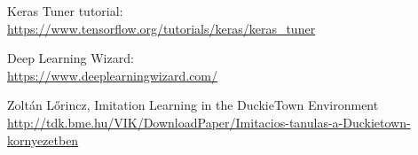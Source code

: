 \documentclass{article}
\begin{document}
Keras Tuner tutorial: 
\\
\url{https://www.tensorflow.org/tutorials/keras/keras_tuner}
\vspace*{1\baselineskip}

Deep Learning Wizard: 
\\
\url{https://www.deeplearningwizard.com/}
\vspace*{1\baselineskip}

Zoltán Lőrincz, Imitation Learning in the DuckieTown Environment
\\
\url{http://tdk.bme.hu/VIK/DownloadPaper/Imitacios-tanulas-a-Duckietown-kornyezetben}

\pagebreak

\clearpage
\end{document}
